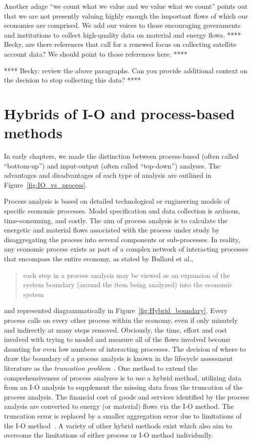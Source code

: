 Another adage ``we count what we value and we value what we count''
points out that we are not presently valuing highly enough
the important flows of which our economies are comprised.
We add our voices to those encouraging governments and 
institutions to collect high-quality data on material 
and energy flows.
**** Becky, are there references that call for a renewed focus on 
collecting satellite account data? 
We should point to those references here. ****
 
**** Becky: review the above paragraphs.
Can you provide additional context on the decision
to stop collecting this data? ****

\section{Hybrids of I-O and process-based methods}
\label{sec:hybrid}

In early chapters,
we made the distinction between
process-based (often called ``bottom-up'') 
and input-output (often called ``top-down'')
analyses.
The advantages and disadvantages of each type
of analysis are outlined in Figure~\ref{fig:IO_vs_process}.

Process analysis is based on detailed technological
or engineering models of specific economic processes.
Model specification and data collection is arduous,
time-consuming,
and costly.
The aim of process analysis is to calculate the
energetic and material flows associated with the process
under study by disaggregating the process into
several components or sub-processes.
In reality,
any economic process exists as part of a complex network of
interacting processes that encompass the entire economy, as
stated by Bullard et al., 
\begin{quote}
	each step in a process analysis may be viewed as 
	an expansion of the system boundary 
	(around the item being analyzed) 
	into the economic system~\cite[p.281]{Bullard:1978vd}
\end{quote}
and represented diagrammatically in Figure~\ref{fig:Hybrid_boundary}.
Every process calls on every other process within the economy,
even if only minutely and indirectly at many steps removed.
Obviously,
the time, 
effort and cost involved with trying to model and
measure all of the flows involved become daunting
for even low numbers of interacting processes.
The decision of where to draw the boundary of
a process analysis is known in the 
lifecycle assessment literature as the 
\emph{truncation problem}~\cite{Suh2004}.
One method to extend the comprehensiveness of process
analyses is to use a hybrid method,
utilizing data from an I-O analysis to supplement the
missing data from the truncation of the process analysis.
The financial cost of goods and services identified by
the process analysis are converted to energy
(or material) flows via the I-O method.
The truncation error is replaced by a smaller aggregation
error due to limitations of the I-O 
method~\cite{Bullard:1978vd}.
A variety of other hybrid methods exist which also aim to
overcome the limitations of either process or I-O method 
individually.\cite{Bullard:1978vd, Suh2004, Suh2002, 
Crawford2008, Zhai2010}

